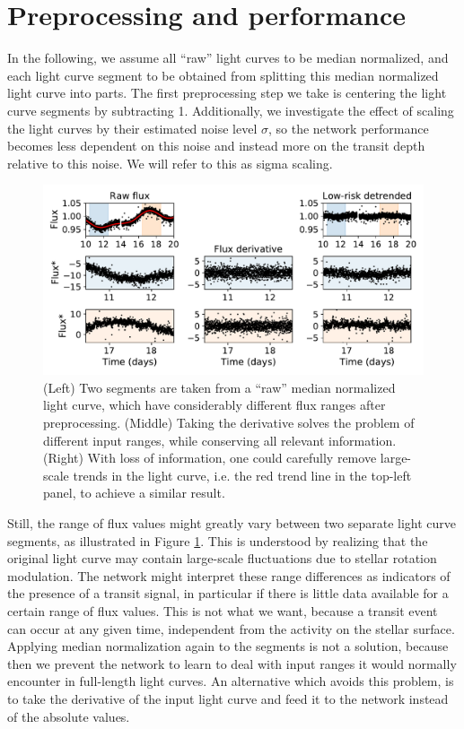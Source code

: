 \section{Preprocessing and performance}
\label{sec:preprocessing}

In the following, we assume all ``raw'' light curves to be median normalized, and each light curve segment to be obtained from splitting this median normalized light curve into parts. The first preprocessing step we take is centering the light curve segments by subtracting 1.  Additionally, we investigate the effect of scaling the light curves by their estimated noise level $\sigma$, so the network performance becomes less dependent on this noise and instead more on the transit depth relative to this noise. We will refer to this as sigma scaling.

\begin{figure}
    \centering
    \includegraphics[width=0.7\linewidth]{Experiments/Figures/Preprocessing/input-range-example.pdf}
    \caption{(Left) Two segments are taken from a ``raw'' median normalized light curve, which have considerably different flux ranges after preprocessing. (Middle) Taking the derivative solves the problem of different input ranges, while conserving all relevant information. (Right) With loss of information, one could carefully remove large-scale trends in the light curve, i.e. the red trend line in the top-left panel, to achieve a similar result.}
    \label{fig:input_ranges}
\end{figure}

Still, the range of flux values might greatly vary between two separate light curve segments, as illustrated in Figure \ref{fig:input_ranges}. This is understood by realizing that the original light curve may contain large-scale fluctuations due to stellar rotation modulation. The network might interpret these range differences as indicators of the presence of a transit signal, in particular if there is little data available for a certain range of flux values. This is not what we want, because a transit event can occur at any given time, independent from the activity on the stellar surface. Applying median normalization again to the segments is not a solution, because then we prevent the network to learn to deal with input ranges it would normally encounter in full-length light curves. An alternative which avoids this problem, is to take the derivative of the input light curve and feed it to the network instead of the absolute values.

